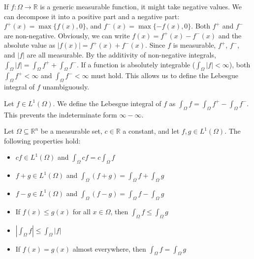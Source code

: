 If $f: \Omega \rightarrow \mathbb{R}$ is a generic measurable function, it might take negative values. We can decompose it into a positive part and a negative part:
$f^+(x) = \max\{f(x), 0\}$, and $f^-(x) = \max\{-f(x), 0\}$.
Both $f^+$ and $f^-$ are non-negative. Obviously, we can write $f(x) = f^+(x) - f^-(x)$ and the absolute value as $|f(x)| = f^+(x) + f^-(x)$.
Since $f$ is measurable, $f^+$, $f^-$, and $|f|$ are all measurable. By the additivity of non-negative integrals, $\int_\Omega |f| = \int_\Omega f^+ + \int_\Omega f^-$.
If a function is absolutely integrable ($\int_\Omega |f| < \infty$), both $\int_\Omega f^+ < \infty$ and $\int_\Omega f^- < \infty$ must hold. This allows us to define the Lebesgue integral of $f$ unambiguously.

\begin{definition}
    Let $f \in L^1(\Omega)$. We define the Lebesgue integral of $f$ as $\int_\Omega f = \int_\Omega f^+ - \int_\Omega f^-$. This prevents the indeterminate form $\infty - \infty$.
\end{definition}

\begin{theorem}
    Let $\Omega \subseteq \mathbb{R}^n$ be a measurable set, $c \in \mathbb{R}$ a constant, and let $f,g \in L^1(\Omega)$. The following properties hold:
    \begin{itemize}
        \item[(a)] $cf \in L^1(\Omega)$ and $\int_\Omega cf = c \int_\Omega f$ 
        \item[(b)] $f+g \in L^1(\Omega)$ and $\int_\Omega (f+g) = \int_\Omega f + \int_\Omega g$
        \item[(c)] $f-g \in L^1(\Omega)$ and $\int_\Omega (f-g) = \int_\Omega f - \int_\Omega g$
        \item[(d)] If $f(x) \le g(x)$ for all $x \in \Omega$, then $\int_\Omega f \le \int_\Omega g$
        \item[(e)] $|\int_\Omega f| \le \int_\Omega |f|$
        \item[(f)] If $f(x) = g(x)$ almost everywhere, then $\int_\Omega f = \int_\Omega g$
    \end{itemize}
\end{theorem}

